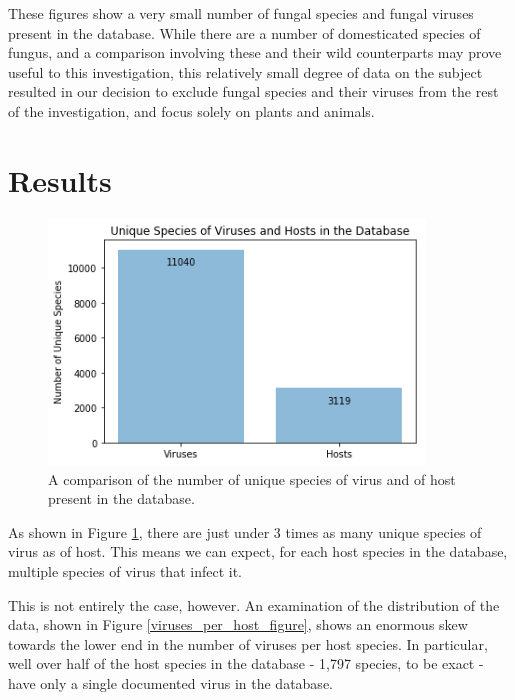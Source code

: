 \documentclass[12pt]{article}
\begin{document}
    These figures show a very small number of fungal species and fungal viruses
    present in the database. While there are a number of domesticated species of
    fungus, and a comparison involving these and their wild counterparts may
    prove useful to this investigation, this relatively small degree of data
    on the subject resulted in our decision to exclude fungal species and their
    viruses from the rest of the investigation, and focus solely on plants and
    animals.

    \section{Results}

    \begin{figure}[H]
        \begin{center}
            \includegraphics[width=100mm]{unique_species_figure.png}
            \caption{A comparison of the number of unique species of virus and of
            host present in the database.}
            \label{unique_species_figure}
        \end{center}
    \end{figure}

    As shown in Figure \ref{unique_species_figure}, there are just under 3
    times as many unique species of virus as of host. This means we can expect,
    for each host species in the database, multiple species of virus that infect
    it.

    This is not entirely the case, however. An examination of the distribution of
    the data, shown in Figure \ref{viruses_per_host_figure}, shows an enormous skew
    towards the lower end in the number of viruses per host species. In particular,
    well over half of the host species in the database - 1,797 species, to be exact -
    have only a single documented virus in the database.
    
\end{document}
